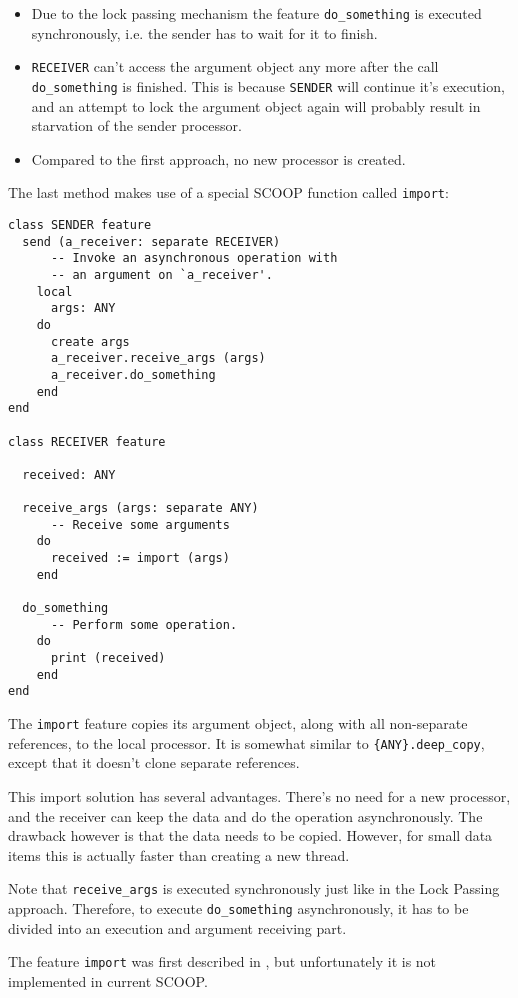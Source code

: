 \documentclass[a4paper,10pt]{report}
\begin{document}
\begin{itemize}
 \item Due to the lock passing mechanism  the feature \lstinline!do_something! is executed synchronously, i.e. the sender has to wait for it to finish.
 \item \lstinline!RECEIVER! can't access the argument object any more after the call \lstinline!do_something! is finished.
 This is because \lstinline!SENDER! will continue it's execution, and an attempt to lock the argument object again will probably result in starvation of the sender processor.
 \item Compared to the first approach, no new processor is created.
\end{itemize}

The last method makes use of a special SCOOP function called \lstinline!import!:
\begin{lstlisting}
class SENDER feature
  send (a_receiver: separate RECEIVER)
      -- Invoke an asynchronous operation with
      -- an argument on `a_receiver'.
    local
      args: ANY
    do
      create args
      a_receiver.receive_args (args)
      a_receiver.do_something
    end
end

class RECEIVER feature
  
  received: ANY
  
  receive_args (args: separate ANY)
      -- Receive some arguments
    do
      received := import (args)
    end

  do_something
      -- Perform some operation.
    do
      print (received)
    end
end
\end{lstlisting}
The \lstinline!import! feature copies its argument object, along with all non-separate references, to the local processor.
It is somewhat similar to \lstinline!{ANY}.deep_copy!, except that it doesn't clone separate references.

This import solution has several advantages.
There's no need for a new processor, and the receiver can keep the data and do the operation asynchronously.
The drawback however is that the data needs to be copied.
However, for small data items this is actually faster than creating a new thread.

Note that \lstinline!receive_args! is executed synchronously just like in the Lock Passing approach.
Therefore, to execute \lstinline!do_something! asynchronously, it has to be divided into an execution and argument receiving part.

The feature \lstinline!import! was first described in , but unfortunately it is not implemented in current SCOOP.
\end{document}
